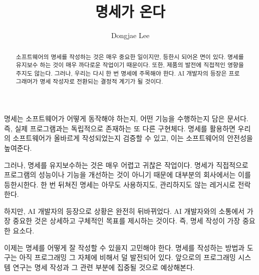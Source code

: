 \documentclass[11pt, oneside]{article}   	%
\title{명세가 온다}
\author{Dongjae Lee}
\date{}
\begin{document}
\maketitle


\begin{abstract}
	소프트웨어의 명세를 작성하는 것은 매우 중요한 일이지만, 등한시 되어온 면이 있다.
	명세를 유지보수 하는 것이 매우 까다로운 작업이기 때문이다.
	또한, 제품의 발전에 직접적인 영향을 주지도 않는다.
	그러나, 우리는 다시 한 번 명세에 주목해야 한다.
	AI 개발자의 등장은 프로그래머가 명세 작성자로 전환되는 결정적 계기가 될 것이다.
\end{abstract}

명세는 소프트웨어가 어떻게 동작해야 하는지, 어떤 기능을 수행하는지 담은 문서다.
즉, 실제 프로그램과는 독립적으로 존재하는 또 다른 구현체다.
명세를 활용하면 우리의 소프트웨어가 올바르게 작성되었는지 검증할 수 있고, 이는 소프트웨어의 안전성을 높여준다.

그러나, 명세를 유지보수하는 것은 매우 어렵고 귀찮은 작업이다.
명세가 직접적으로 프로그램의 성능이나 기능을 개선하는 것이 아니기 때문에 대부분의 회사에서는 이를 등한시한다.
한 번 뒤쳐진 명세는 아무도 사용하지도, 관리하지도 않는 레거시로 전락한다.

하지만, AI 개발자의 등장으로 상황은 완전히 뒤바뀌었다.
AI 개발자와의 소통에서 가장 중요한 것은 상세하고 구체적인 목표를 제시하는 것이다.
즉, 명세 작성이 가장 중요한 요소다.

이제는 명세를 어떻게 잘 작성할 수 있을지 고민해야 한다.
명세를 작성하는 방법과 도구는 아직 프로그래밍 그 자체에 비해서 덜 발전되어 있다.
앞으로의 프로그래밍 시스템 연구는 명세 작성과 그 관련 부분에 집중될 것으로 예상해본다.
\end{document}
